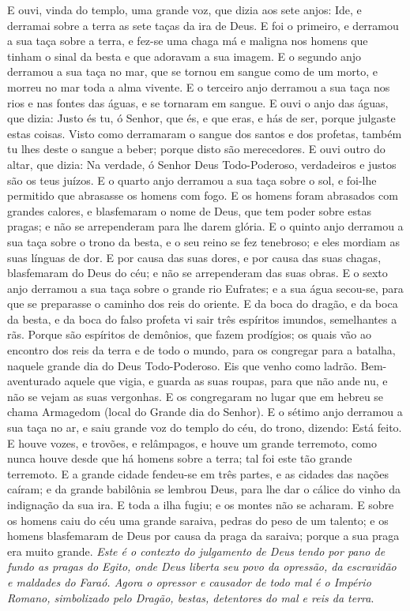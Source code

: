 \documentclass[
]{book}
\begin{document}
E ouvi, vinda do templo, uma grande voz, que dizia aos sete anjos: Ide, e derramai sobre a terra as sete taças da ira de Deus. E foi o primeiro, e derramou a sua taça sobre a terra, e fez-se uma chaga má e maligna nos homens que tinham o sinal da besta e que adoravam a sua imagem. E o segundo anjo derramou a sua taça no mar, que se tornou em sangue como de um morto, e morreu no mar toda a alma vivente. E o terceiro anjo derramou a sua taça nos rios e nas fontes das águas, e se tornaram em sangue. E ouvi o anjo das águas, que dizia: Justo és tu, ó Senhor, que és, e que eras, e hás de ser, porque julgaste estas coisas. Visto como derramaram o sangue dos santos e dos profetas, também tu lhes deste o sangue a beber; porque disto são merecedores. E ouvi outro do altar, que dizia: Na verdade, ó Senhor Deus Todo-Poderoso, verdadeiros e justos são os teus juízos. E o quarto anjo derramou a sua taça sobre o sol, e foi-lhe permitido que abrasasse os homens com fogo. E os homens foram abrasados com grandes calores, e blasfemaram o nome de Deus, que tem poder sobre estas pragas; e não se arrependeram para lhe darem glória. E o quinto anjo derramou a sua taça sobre o trono da besta, e o seu reino se fez tenebroso; e eles mordiam as suas línguas de dor. E por causa das suas dores, e por causa das suas chagas, blasfemaram do Deus do céu; e não se arrependeram das suas obras. E o sexto anjo derramou a sua taça sobre o grande rio Eufrates; e a sua água secou-se, para que se preparasse o caminho dos reis do oriente. E da boca do dragão, e da boca da besta, e da boca do falso profeta vi sair três espíritos imundos, semelhantes a rãs. Porque são espíritos de demônios, que fazem prodígios; os quais vão ao encontro dos reis da terra e de todo o mundo, para os congregar para a batalha, naquele grande dia do Deus Todo-Poderoso. Eis que venho como ladrão. Bem-aventurado aquele que vigia, e guarda as suas roupas, para que não ande nu, e não se vejam as suas vergonhas. E os congregaram no lugar que em hebreu se chama Armagedom (local do Grande dia do Senhor). E o sétimo anjo derramou a sua taça no ar, e saiu grande voz do templo do céu, do trono, dizendo: Está feito. E houve vozes, e trovões, e relâmpagos, e houve um grande terremoto, como nunca houve desde que há homens sobre a terra; tal foi este tão grande terremoto. E a grande cidade fendeu-se em três partes, e as cidades das nações caíram; e da grande babilônia se lembrou Deus, para lhe dar o cálice do vinho da indignação da sua ira. E toda a ilha fugiu; e os montes não se acharam. E sobre os homens caiu do céu uma grande saraiva, pedras do peso de um talento; e os homens blasfemaram de Deus por causa da praga da saraiva; porque a sua praga era muito grande.
\emph{Este é o contexto do julgamento de Deus tendo por pano de fundo as pragas do Egito, onde Deus liberta seu povo da opressão, da escravidão e maldades do Faraó. Agora o opressor e causador de todo mal é o Império Romano, simbolizado pelo Dragão, bestas, detentores do mal e reis da terra}.
\end{document}
